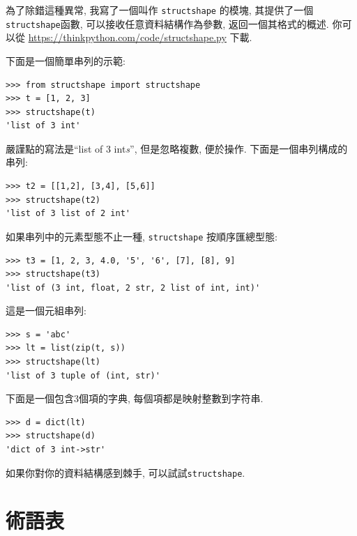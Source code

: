 \documentclass[10pt]{book}
\begin{document}
為了除錯這種異常, 我寫了一個叫作 {\tt structshape} 的模塊, 
其提供了一個{\tt structshape}函數, 可以接收任意資料結構作為參數, 
返回一個其格式的概述. 
你可以從 \url{https://thinkpython.com/code/structshape.py} 下載. 

下面是一個簡單串列的示範:

\begin{verbatim}
>>> from structshape import structshape
>>> t = [1, 2, 3]
>>> structshape(t)
'list of 3 int'
\end{verbatim}
%

嚴謹點的寫法是``list of 3 int{\em s}'', 
但是忽略複數, 便於操作. 下面是一個串列構成的串列:

\begin{verbatim}
>>> t2 = [[1,2], [3,4], [5,6]]
>>> structshape(t2)
'list of 3 list of 2 int'
\end{verbatim}
%
如果串列中的元素型態不止一種, 
{\tt structshape} 按順序匯總型態:

\begin{verbatim}
>>> t3 = [1, 2, 3, 4.0, '5', '6', [7], [8], 9]
>>> structshape(t3)
'list of (3 int, float, 2 str, 2 list of int, int)'
\end{verbatim}
%
這是一個元組串列:

\begin{verbatim}
>>> s = 'abc'
>>> lt = list(zip(t, s))
>>> structshape(lt)
'list of 3 tuple of (int, str)'
\end{verbatim}
%
下面是一個包含3個項的字典, 每個項都是映射整數到字符串.

\begin{verbatim}
>>> d = dict(lt) 
>>> structshape(d)
'dict of 3 int->str'
\end{verbatim}
%
如果你對你的資料結構感到棘手, 可以試試{\tt structshape}.


\section{術語表}
\end{document}
